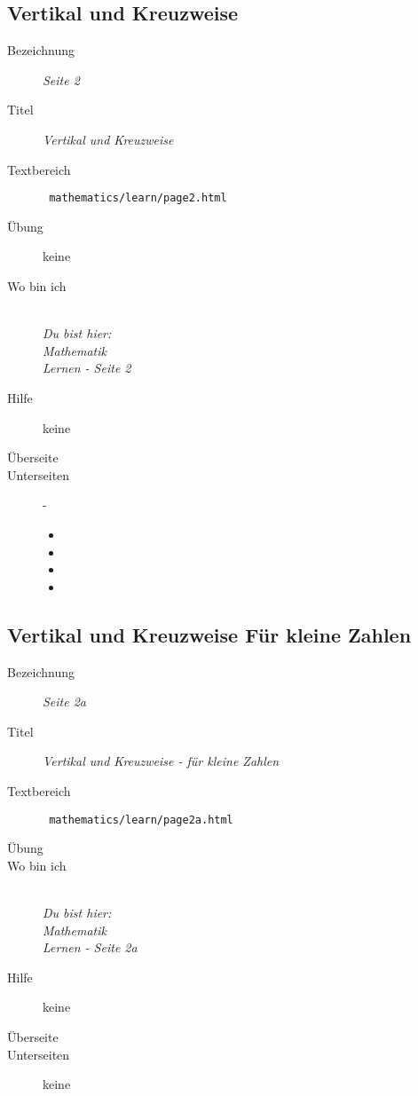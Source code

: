 \subsection{ Vertikal und Kreuzweise }
\label{cha:math-learn-page2}
\begin{description}
  \item[Bezeichnung] \emph{ Seite 2 }
  \item[Titel] \emph{ Vertikal und Kreuzweise }
  \item[Textbereich] \texttt{ mathematics/learn/page2.html }
  \item[Übung] keine
  \item[Wo bin ich] \emph{\\Du bist hier:\\Mathematik\\Lernen - Seite 2 }
  \item[Hilfe] keine
  \item[Überseite] 
  \item[Unterseiten] -
  \begin{itemize}
    \item {}
    \item {}
    \item {}
    \item {}
  \end{itemize}
\end{description}


\subsection{ Vertikal und Kreuzweise Für kleine Zahlen }
\label{cha:math-learn-page2a}
\begin{description}
  \item[Bezeichnung] \emph{ Seite 2a }
  \item[Titel] \emph{ Vertikal und Kreuzweise - für kleine Zahlen }
  \item[Textbereich] \texttt{ mathematics/learn/page2a.html }
  \item[Übung] 
  \item[Wo bin ich] \emph{\\Du bist hier:\\Mathematik\\Lernen - Seite 2a }
  \item[Hilfe] keine
  \item[Überseite] 
  \item[Unterseiten] keine
\end{description}


